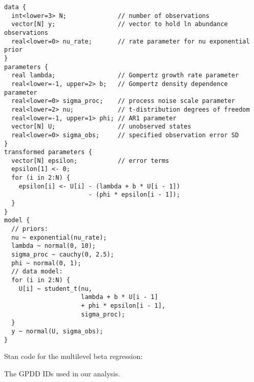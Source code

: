 \begin{spacing}{1.15}
\begin{footnotesize}
\begin{verbatim}
data {
  int<lower=3> N;              // number of observations
  vector[N] y;                 // vector to hold ln abundance observations
  real<lower=0> nu_rate;       // rate parameter for nu exponential prior
}
parameters {
  real lambda;                 // Gompertz growth rate parameter
  real<lower=-1, upper=2> b;   // Gompertz density dependence parameter
  real<lower=0> sigma_proc;    // process noise scale parameter
  real<lower=2> nu;            // t-distribution degrees of freedom
  real<lower=-1, upper=1> phi; // AR1 parameter
  vector[N] U;                 // unobserved states
  real<lower=0> sigma_obs;     // specified observation error SD
}
transformed parameters {
  vector[N] epsilon;           // error terms
  epsilon[1] <- 0;
  for (i in 2:N) {
    epsilon[i] <- U[i] - (lambda + b * U[i - 1])
                       - (phi * epsilon[i - 1]);
  }
}
model {
  // priors:
  nu ~ exponential(nu_rate);
  lambda ~ normal(0, 10);
  sigma_proc ~ cauchy(0, 2.5);
  phi ~ normal(0, 1);
  // data model:
  for (i in 2:N) {
    U[i] ~ student_t(nu,
                     lambda + b * U[i - 1]
                     + phi * epsilon[i - 1],
                     sigma_proc);
  }
  y ~ normal(U, sigma_obs);
}
\end{verbatim}
\end{footnotesize}

\clearpage
\noindent
Stan code for the multilevel beta regression:
\begin{footnotesize}

\end{footnotesize}

\clearpage

\noindent
The GPDD IDs used in our analysis.

\begin{footnotesize}
\noindent
{\tt

}
\end{footnotesize}
\end{spacing}
